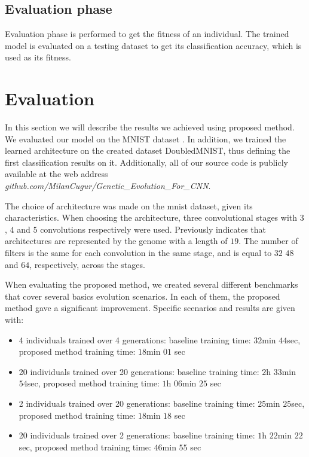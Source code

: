 \documentclass[eng]{simposium}
\begin{document}
\subsection{Evaluation phase}
Evaluation phase is performed to get the fitness of an individual.
The trained model is evaluated on a testing dataset to get its classification accuracy, which is used as its fitness.

\section{Evaluation}

In this section we will describe the results we achieved using proposed method. 
We evaluated our model on the MNIST dataset \cite{8}. In addition, we trained the learned architecture on the 
created dataset DoubledMNIST, thus defining the first classification results on it. 
Additionally, all of our source code is publicly available at the web address \textit{github.com/MilanCugur/Genetic\_Evolution\_For\_CNN}. 

The choice of architecture was made on the mnist dataset, given its characteristics. 
When choosing the architecture, three convolutional stages with $3$, $4$ and $5$ convolutions respectively were used. 
Previously indicates that architectures are represented by the genome with a length of $19$.
The number of filters is the same for each convolution in the same stage, and is equal to $32$ $48$ and $64$, respectively, across the stages. 

When evaluating the proposed method, we created several different benchmarks that cover several basics evolution scenarios. 
In each of them, the proposed method gave a significant improvement. 
Specific scenarios and results are given with:
\begin{itemize}
  \item 4 individuals trained over 4 generations: baseline training time: $32$min $44$sec, proposed method training time: $18$min $01$ sec
  \item 20 individuals trained over 20 generations: baseline training time: $2$h $33$min $54$sec, proposed method training time: $1$h $06$min $25$ sec
  \item 2 individuals trained over 20 generations: baseline training time: $25$min $25$sec, proposed method training time: $18$min $18$ sec
  \item 20 individuals trained over 2 generations: baseline training time: $1$h $22$min $22$sec, proposed method training time: $46$min $55$ sec
\end{itemize}
\end{document}
